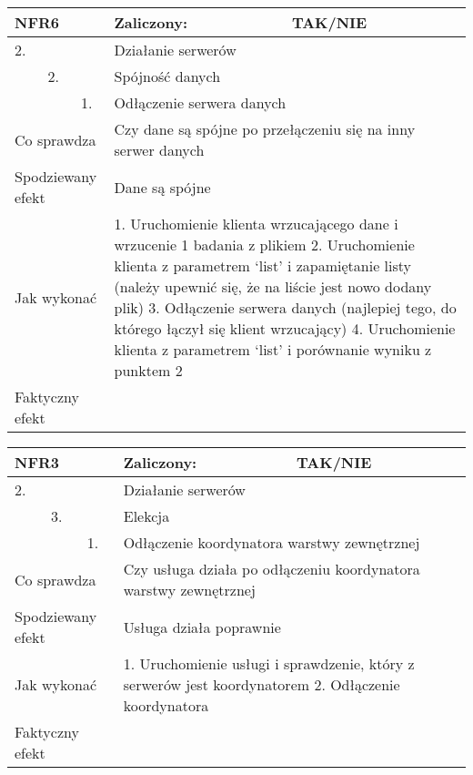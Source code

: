 \begin{tabular}{|p{20pt}|p{20pt}|p{20pt}|p{250pt}|p{60pt}|}
	\hline
	\multicolumn{3}{|p{70pt}|}{NFR6} & Zaliczony: & TAK/NIE \\ \hline
	2. & & & \multicolumn{2}{|p{310pt}|}{Działanie serwerów } \\ \hline
	& 2. & & \multicolumn{2}{|p{310pt}|}{Spójność danych } \\ \hline
	& & 1. & \multicolumn{2}{|p{310pt}|}{Odłączenie serwera danych } \\ \hline
	\multicolumn{3}{|p{70pt}|}{Co sprawdza} & \multicolumn{2}{|p{310pt}|}{Czy dane są spójne po przełączeniu się na inny serwer danych} \\ \hline
	\multicolumn{3}{|p{70pt}|}{Spodziewany efekt} & \multicolumn{2}{|p{310pt}|}{Dane są spójne} \\ \hline
	\multicolumn{3}{|p{70pt}|}{Jak wykonać} & \multicolumn{2}{|p{310pt}|}{1. Uruchomienie klienta wrzucającego dane i wrzucenie 1 badania z plikiem
2. Uruchomienie klienta z parametrem ‘list’ i zapamiętanie listy (należy upewnić się, że na liście jest nowo dodany plik)
3. Odłączenie serwera danych (najlepiej tego, do którego łączył się klient wrzucający)
4. Uruchomienie klienta z parametrem ‘list’ i porównanie wyniku z punktem 2} \\ \hline
	\multicolumn{3}{|p{70pt}|}{Faktyczny efekt} & \multicolumn{2}{|p{310pt}|}{} \\ \hline
\end{tabular}

\begin{tabular}{|p{20pt}|p{20pt}|p{20pt}|p{250pt}|p{60pt}|}
	\hline
	\multicolumn{3}{|p{70pt}|}{NFR3} & Zaliczony: & TAK/NIE \\ \hline
	2. & & & \multicolumn{2}{|p{310pt}|}{Działanie serwerów } \\ \hline
	& 3. & & \multicolumn{2}{|p{310pt}|}{Elekcja } \\ \hline
	& & 1. & \multicolumn{2}{|p{310pt}|}{Odłączenie koordynatora warstwy zewnętrznej } \\ \hline
	\multicolumn{3}{|p{70pt}|}{Co sprawdza} & \multicolumn{2}{|p{310pt}|}{Czy usługa działa po odłączeniu koordynatora warstwy zewnętrznej} \\ \hline
	\multicolumn{3}{|p{70pt}|}{Spodziewany efekt} & \multicolumn{2}{|p{310pt}|}{Usługa działa poprawnie} \\ \hline
	\multicolumn{3}{|p{70pt}|}{Jak wykonać} & \multicolumn{2}{|p{310pt}|}{1. Uruchomienie usługi i sprawdzenie, który z serwerów jest koordynatorem
2. Odłączenie koordynatora} \\ \hline
	\multicolumn{3}{|p{70pt}|}{Faktyczny efekt} & \multicolumn{2}{|p{310pt}|}{} \\ \hline
\end{tabular}

